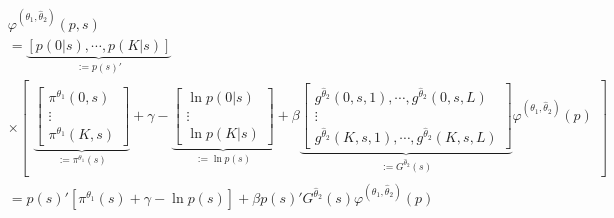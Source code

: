 \documentclass[
]{book}
\begin{document}
\begin{equation}
\begin{split}
&\varphi^{(\theta_1, \hat{\theta}_2)}(p, s)\\
&=\underbrace{[p(0|s), \cdots, p(K|s)]}_{:= p(s)'} \\
&\times\begin{bmatrix}
\underbrace{\begin{bmatrix}
\pi^{\theta_1}(0, s)\\
\vdots\\
\pi^{\theta_1}(K, s)
\end{bmatrix}}_{:= \pi^{\theta_1}(s)}
+ \gamma
-
\underbrace{\begin{bmatrix}
\ln p(0|s)\\
\vdots\\
\ln p(K|s)
\end{bmatrix}}_{:= \ln p(s)}
+\beta
\underbrace{\begin{bmatrix}
g^{\hat{\theta}_2}(0, s, 1), \cdots, g^{\hat{\theta}_2}(0, s, L)\\
\vdots\\
g^{\hat{\theta}_2}(K, s, 1), \cdots, g^{\hat{\theta}_2}(K, s, L)
\end{bmatrix}}_{:= G^{\hat{\theta}_2}(s)}
\varphi^{(\theta_1, \hat{\theta}_2)}(p)
\end{bmatrix}\\
&=p(s)'[\pi^{\theta_1}(s) + \gamma - \ln p(s)] + \beta p(s)' G^{\hat{\theta}_2}(s)  \varphi^{(\theta_1, \hat{\theta}_2)}(p)
\end{split}
\end{equation}
\end{document}
